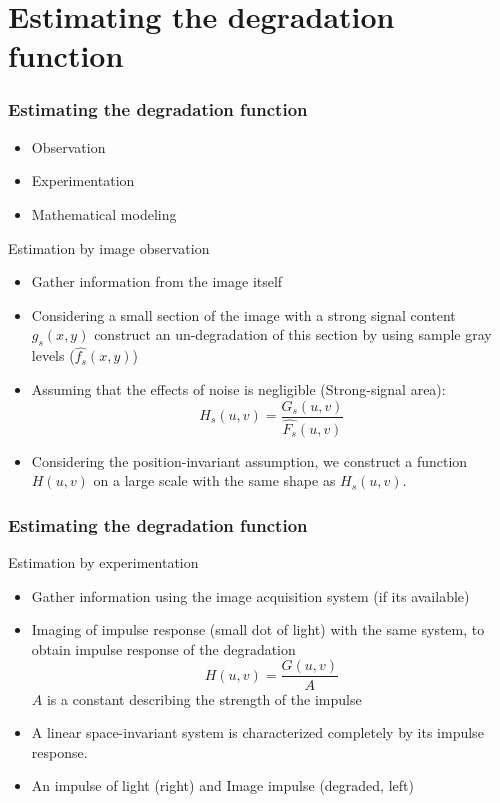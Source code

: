 \documentclass{beamer}
\begin{document}
\section{Estimating the degradation function}
\begin{frame}
\frametitle{Estimating the degradation function}
\begin{itemize}
	\item Observation
	\item Experimentation 
	\item Mathematical modeling
\end{itemize}
\begin{block}{Estimation by image observation}
\scriptsize{
\begin{itemize}
	\item Gather information from the image itself	
	\item Considering a small section of the image with a strong signal content $g_{s}(x,y)$ construct an un-degradation of this section by using sample gray levels ($\hat{f_{s}}(x, y)$)	
	\item Assuming that the effects of noise is negligible (Strong-signal area):
	$$H_{s}(u,v) = \frac{G_{s}(u,v)}{\hat{F_{s}}(u,v)}$$
	\item Considering the position-invariant assumption, we construct a function $H(u,v)$ on a large scale with the same shape as $H_{s}(u,v)$.
\end{itemize}
}
\end{block}
\end{frame}
\begin{frame}
\frametitle{Estimating the degradation function}
\begin{block}{Estimation by experimentation}
\scriptsize{
\begin{itemize}
	\item Gather information using the image acquisition system (if its available)
	\item Imaging of impulse response (small dot of light) with the same system, to obtain impulse response of the degradation
	$$H(u,v) = \frac{G(u,v)}{A}$$
	\noindent $A$ is a constant describing the strength of the impulse
	\item A linear space-invariant system is characterized completely by its impulse response. 
	\item An impulse of light (right) and Image impulse (degraded, left)
	\end{itemize}
}
\end{block}
\end{frame}
\end{document}

